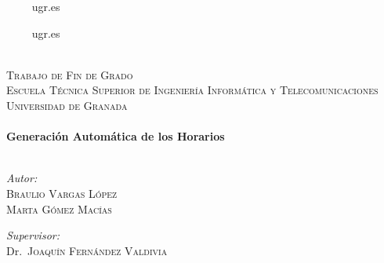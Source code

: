 
\begin{titlepage}

\begin{center}

\begin{minipage}{0.4\textwidth}
\begin{flushright}
$\qquad$
      {ugr.es}\\[1cm]
\end{flushright}
\end{minipage}
\begin{minipage}{0.4\textwidth}
\begin{flushleft}
$\qquad$
      {ugr.es}
\end{flushleft}
\end{minipage}
~\\[1cm]

\textsc{\LARGE Trabajo de Fin de Grado}\\[1.5cm]
\textsc{\Large Escuela Técnica Superior de Ingeniería Informática y Telecomunicaciones}\\[0.5cm]
\textsc{\Large Universidad de Granada}\\[0.5cm]


\HRule \\[0.4cm]
{\huge\bfseries Generación Automática de los Horarios}\\[0.4cm]

\HRule \\[1.5cm]

\begin{minipage}{0.4\textwidth}
\begin{flushleft} \large
\emph{Autor:}\\
\textsc{Braulio Vargas López}\\
\textsc{Marta Gómez Macías}
\end{flushleft}
\end{minipage}
\begin{minipage}{0.4\textwidth}
\begin{flushright} \large
\emph{Supervisor:} \\
Dr.~\textsc{Joaquín Fernández Valdivia}
\end{flushright}
\end{minipage}


\end{center}
\end{titlepage}
